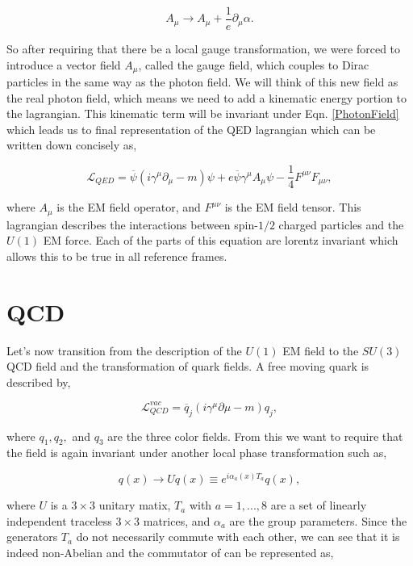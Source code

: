 \begin{equation}\label{PhotonField}
 A_\mu\rightarrow A_\mu+\frac{1}{e}\partial_\mu\alpha.
 \end{equation}
 
 So after requiring that there be a local gauge transformation, we were forced to introduce a vector field $A_\mu$, called the gauge field, which couples to Dirac particles in the same way as the photon field. We will think of this new field as the real photon field, which means we need to add a kinematic energy portion to the lagrangian. This kinematic term will be invariant under Eqn. \ref{PhotonField} which leads us to final representation of the QED lagrangian which can be written down concisely as, 
 
 \begin{equation}\label{LagrangianQED}
\mathcal{L}_{QED}=\overline{\psi}(i\gamma^\mu\partial_\mu-m)\psi+e\overline{\psi}\gamma^{\mu}A_{\mu}\psi-\frac{1}{4}F^{\mu\nu}F_{\mu\nu},
 \end{equation}

where $A_{\mu}$ is the EM field operator, and $F^{\mu\nu}$ is the EM field tensor. This lagrangian describes the interactions between spin-$1/2$ charged particles and the $U(1)$ EM force. Each of the parts of this equation are lorentz invariant which allows this to be true in all reference frames. 

\section{QCD}

Let's now transition from the description of the $U(1)$ EM field to the $SU(3)$ QCD field and the transformation of quark fields. A free moving quark is described by,

\begin{equation}\label{LagrangianQCDVacuum}
\mathcal{L}_{QCD}^{vac}=\overline{q}_j(i\gamma^\mu\partial\mu-m)q_j,
\end{equation}

where $q_1, q_2,$ and $q_3$ are the three color fields. From this we want to require that the field is again invariant under another local phase transformation such as,

\begin{equation}
q(x)\rightarrow Uq(x)\equiv e^{i\alpha_a(x)T_a}q(x),
\end{equation}

where $U$ is a $3\times3$ unitary matix, $T_a$ with $a=1,...,8$ are a set of linearly independent traceless $3\times3$ matrices, and $\alpha_a$ are the group parameters. Since the generators $T_a$ do not necessarily commute with each other, we can see that it is indeed non-Abelian and the commutator of can be represented as,

